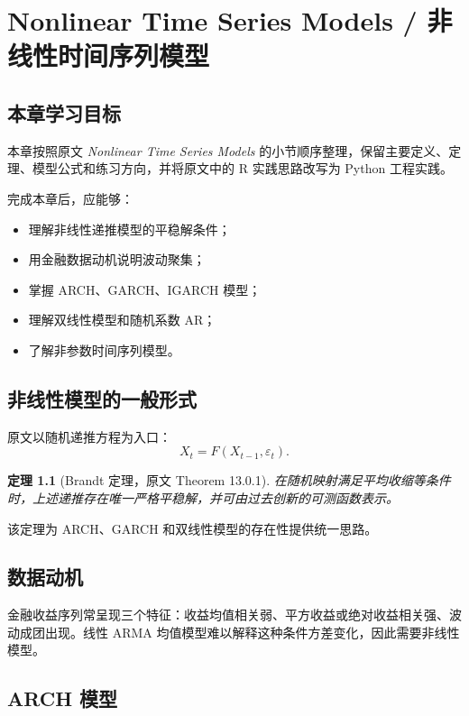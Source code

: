 \documentclass[11pt,a4paper,openany]{ctexbook}
\newtheorem{theorem}{定理}[section]
\begin{document}
\clearpage
\chapter{Nonlinear Time Series Models / 非线性时间序列模型}
\section*{本章学习目标}

本章按照原文 \textit{Nonlinear Time Series Models} 的小节顺序整理，保留主要定义、定理、模型公式和练习方向，并将原文中的 R 实践思路改写为 Python 工程实践。

完成本章后，应能够：
\begin{itemize}
  \item 理解非线性递推模型的平稳解条件；
  \item 用金融数据动机说明波动聚集；
  \item 掌握 ARCH、GARCH、IGARCH 模型；
  \item 理解双线性模型和随机系数 AR；
  \item 了解非参数时间序列模型。
\end{itemize}

\section{非线性模型的一般形式}

原文以随机递推方程为入口：
\[
  X_t=F(X_{t-1},\varepsilon_t).
\]
\begin{theorem}[Brandt 定理，原文 Theorem 13.0.1]
在随机映射满足平均收缩等条件时，上述递推存在唯一严格平稳解，并可由过去创新的可测函数表示。
\end{theorem}

该定理为 ARCH、GARCH 和双线性模型的存在性提供统一思路。

\section{数据动机}

金融收益序列常呈现三个特征：收益均值相关弱、平方收益或绝对收益相关强、波动成团出现。线性 ARMA 均值模型难以解释这种条件方差变化，因此需要非线性模型。

\section{ARCH 模型}
\end{document}

